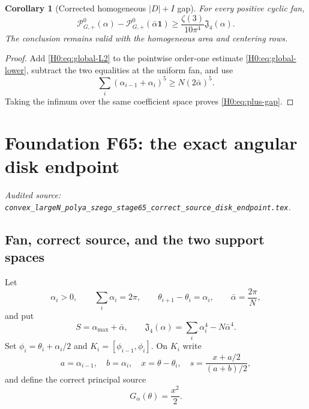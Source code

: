 \documentclass[11pt]{amsart}
\numberwithin{equation}{section}
\newtheorem{corollary}[theorem]{Corollary}
\theoremstyle{definition}
\theoremstyle{remark}
\newcommand{\Jfour}{\mathfrak J_4}
\newcommand{\PGplus}{\mathcal P_{G,+}^0}
\begin{document}
\begin{corollary}[Corrected homogeneous $|D|+I$ gap]\label{H0:cor:plus-gap}
For every positive cyclic fan,
\begin{equation}\label{H0:eq:plus-gap}
 \boxed{
 \PGplus(\alpha)-\PGplus(\bar\alpha\mathbf1)
 \ge\frac{\zeta(3)}{10\pi^4}\Jfour(\alpha).}
\end{equation}
The conclusion remains valid with the homogeneous area and centering rows.
\end{corollary}

\begin{proof}
Add \eqref{H0:eq:global-L2} to the pointwise order-one estimate
\eqref{H0:eq:global-lower}, subtract the two equalities at the uniform fan,
and use
\begin{equation}
 \sum_i(\alpha_{i-1}+\alpha_i)^5
 \ge N(2\bar\alpha)^5.
\end{equation}
Taking the infimum over the same coefficient space proves
\eqref{H0:eq:plus-gap}.
\end{proof}
\endgroup

\begingroup
\section{Foundation F65: the exact angular disk endpoint}
\label{module:F65}
\noindent\textit{Audited source: \nolinkurl{convex_largeN_polya_szego_stage65_correct_source_disk_endpoint.tex}.}
\subsection{Fan, correct source, and the two support spaces}

Let
\begin{equation}\label{F65:eq:fan}
 \alpha_i>0,\qquad \sum_i\alpha_i=2\pi,
 \qquad \theta_{i+1}-\theta_i=\alpha_i,
 \qquad \bar\alpha=\frac{2\pi}{N},
\end{equation}
and put
\begin{equation}\label{F65:eq:SJ}
 S=\alpha_{\max}+\bar\alpha,
 \qquad
 \Jfour(\alpha)=\sum_i\alpha_i^4-N\bar\alpha^4.
\end{equation}
Set $\phi_i=\theta_i+\alpha_i/2$ and
$K_i=[\phi_{i-1},\phi_i]$.  On $K_i$ write
\begin{equation}
 a=\alpha_{i-1},\quad b=\alpha_i,\quad
 x=\theta-\theta_i,\quad
 s=\frac{x+a/2}{(a+b)/2},
\end{equation}
and define the correct principal source
\begin{equation}\label{F65:eq:G}
 G_\alpha(\theta)=\frac{x^2}{2}.
\end{equation}
\end{document}
